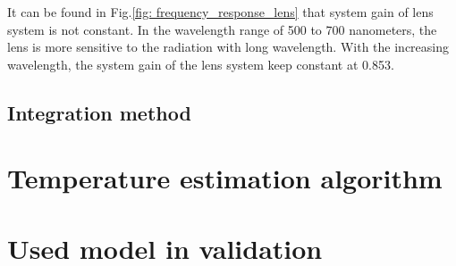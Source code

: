 It can be found in Fig.\ref{fig: frequency_response_lens} that system gain 
of lens system is not constant. In the wavelength range of 500 to 700 nanometers, 
the lens is more sensitive to the radiation with long wavelength. With the 
increasing wavelength, the system gain of the lens system keep constant at 0.853.



\subsection{Integration method}


%
%

\section{Temperature estimation algorithm}


\section{Used model in validation}%

%
%
